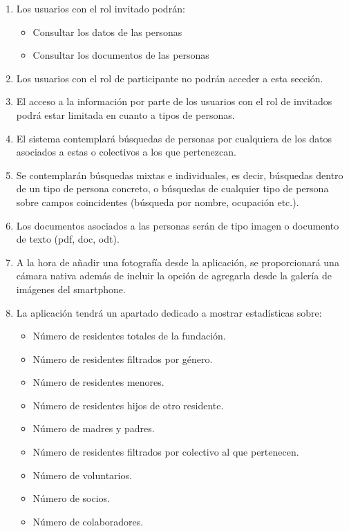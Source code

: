 \begin{enumerate}[start=9,label={RF-\arabic*.}]
\begin{itemize}
        \end{itemize}
    \item Los usuarios con el rol invitado podrán:
        \begin{itemize}
            \item Consultar los datos de las personas
            \item Consultar los documentos de las personas
        \end{itemize}
    \item Los usuarios con el rol de participante no podrán acceder a esta sección.
    \item El acceso a la información por parte de los usuarios con el rol de invitados podrá estar limitada en cuanto a tipos de personas.
    \item El sistema contemplará búsquedas de personas por cualquiera de los datos asociados a estas o colectivos a los que pertenezcan.
    \item Se contemplarán búsquedas mixtas e individuales, es decir, búsquedas dentro de un tipo de persona concreto, o búsquedas de cualquier tipo de persona sobre campos coincidentes (búsqueda por nombre, ocupación etc.).
    \item Los documentos asociados a las personas serán de tipo imagen o documento de texto (pdf, doc, odt).
    \item A la hora de añadir una fotografía desde la aplicación, se proporcionará una cámara nativa además de incluir la opción de agregarla desde la galería de imágenes del smartphone.
    \item \label{rf-es-personas} La aplicación tendrá un apartado dedicado a mostrar estadísticas sobre:
        \begin{itemize}
            \item Número de residentes totales de la fundación.
            \item Número de residentes filtrados por género.
            \item Número de residentes menores.
            \item Número de residentes hijos de otro residente.
            \item Número de madres y padres.
            \item Número de residentes filtrados por colectivo al que pertenecen.
            \item Número de voluntarios.
            \item Número de socios.
            \item Número de colaboradores.

\end{itemize}
\end{enumerate}
